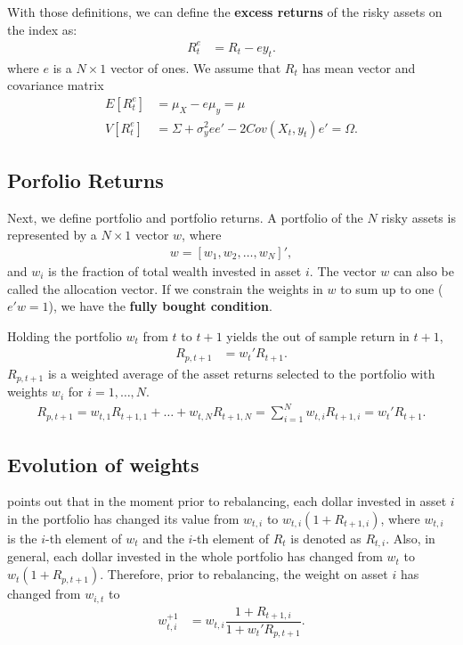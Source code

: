 \documentclass[12pt,oneside,a4paper]{memoir}
\begin{document}
With those definitions, we can define the \textbf{excess returns} of the risky assets on the index as:
\begin{align*}
	R^{e}_{t} &= R_{t} - e y_{t}.
\end{align*}
where $e$ is a $N \times 1$ vector of ones.
We assume that $R_{t}$ has mean vector and covariance matrix 
\begin{align*}
E[R^{e}_{t}] &= \mu_{X}-e\mu_{y}=\mu
\\
V[R^{e}_{t}] &= \Sigma + \sigma_{y}^{2}ee' - 2Cov(X_{t},y_{t})e' =\Omega.
\end{align*}


\subsection*{Porfolio Returns}

Next, we define portfolio and portfolio returns.
A portfolio of the $N$ risky assets is represented by a $N\times 1$ vector $w$, where
\begin{align*}
	w = \left[ w_1, w_2 , \dots, w_N \right]',
\end{align*}
and $w_{i}$ is the fraction of total wealth invested in asset $i$.
The vector $w$ can also be called the allocation vector.
If we constrain the weights in $w$ to sum up to one ($e'w=1$), we have the \textbf{fully bought condition}.

Holding the portfolio $w_{t}$ from $t$ to $t+1$ yields the out of sample return in $t+1$,
\begin{align} \label{eq:retport}
	R_{p,t+1} &= w_{t}'R_{t+1}.
\end{align}
$R_{p,t+1}$ is a weighted average of the asset returns selected to the portfolio with weights $w_{i}$ for $i=1,\dots,N$.
\begin{align*} \label{ret_port}
	R_{p,t+1} = w_{t,1} R_{t+1,1} + \dots + w_{t,N} R_{t+1,N}
	= \sum_{i=1}^{N} w_{t,i} R_{t+1,i} = w_{t}'R_{t+1}.
\end{align*}

\subsection*{Evolution of weights}

 points out that in the moment prior to rebalancing, each dollar invested in asset $i$ in the portfolio has changed its value from $w_{t,i}$ to $w_{t,i}(1+R_{t+1,i})$, where $w_{t,i}$ is the $i$-th element of $w_{t}$ and the $i$-th element of $R_{t}$ is denoted as $R_{t,i}$.
Also, in general, each dollar invested in the whole portfolio has changed from $w_{t}$ to $w_{t}(1+R_{p,t+1})$.
Therefore, prior to rebalancing, the weight on asset $i$ has changed from $w_{i,t}$ to 
\begin{align*}
	w_{t,i}^{+1} &= w_{t,i} \dfrac{1+R_{t+1,i}}{1+w_{t}'R_{p,t+1}}.
\end{align*}
\end{document}
